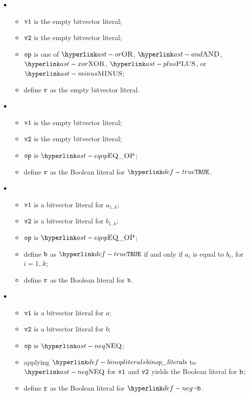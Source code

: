 \begin{itemize}
  \item {}
  \begin{itemize}
    \item $\texttt{v1}$ is the empty bitvector literal;
    \item $\texttt{v2}$ is the empty bitvector literal;
    \item $\texttt{op}$ is one of $\OR$, $\AND$, $\XOR$, $\PLUS$, or $\MINUS$;
    \item define $\texttt{r}$ as the empty bitvector literal.
  \end{itemize}

  \item {}
  \begin{itemize}
    \item $\texttt{v1}$ is the empty bitvector literal;
    \item $\texttt{v2}$ is the empty bitvector literal;
    \item $\texttt{op}$ is $\EQOP$;
    \item define $\texttt{r}$ as the Boolean literal for $\True$.
  \end{itemize}

  \item {}
  \begin{itemize}
    \item $\texttt{v1}$ is a bitvector literal for $a_{1..k}$;
    \item $\texttt{v2}$ is a bitvector literal for $b_{1..k}$;
    \item $\texttt{op}$ is $\EQOP$;
    \item define $\texttt{b}$ as $\True$ if and only if $a_i$ is equal to $b_i$, for $i=1..k$;
    \item define $\texttt{r}$ as the Boolean literal for $\texttt{b}$.
  \end{itemize}

  \item {}
  \begin{itemize}
    \item $\texttt{v1}$ is a bitvector literal for $a$;
    \item $\texttt{v2}$ is a bitvector literal for $b$;
    \item $\texttt{op}$ is $\NEQ$;
    \item applying $\binopliterals$ to $\NEQ$ for $\texttt{v1}$ and $\texttt{v2}$ yields the Boolean literal for $\texttt{b}$\ProseOrTypeError;
    \item define $\texttt{r}$ as the Boolean literal for $\neg\vb$.
  \end{itemize}


\end{itemize}
